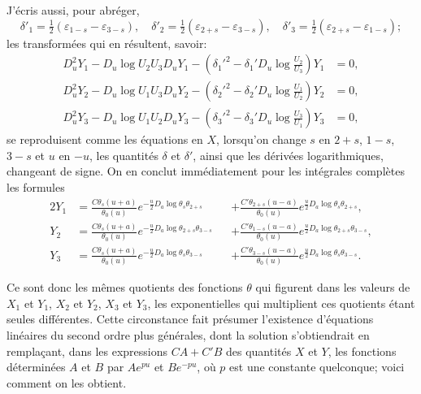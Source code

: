 \documentclass[11pt,leqno,oneside,letterpaper]{book}[2005/09/16]
\begin{document}
J'\'ecris aussi, pour abr\'eger,
\[
\delta'_1 = \tfrac{1}{2}( \varepsilon_{1-s} - \varepsilon_{3-s}), \quad
\delta'_2 = \tfrac{1}{2}( \varepsilon_{2+s} - \varepsilon_{3-s}), \quad
\delta'_3  = \tfrac{1}{2}( \varepsilon_{2+s} - \varepsilon_{1-s});
\]
les transform\'ees qui en r\'esultent, savoir:
\begin{align*}
D_u^2 Y_1 - D_u \log U_2 U_3 D_u Y_1 - \left( \delta_1'^2 - \delta_1' D_u \log \frac{U_2}{U_3} \right) Y_1 &= 0, \\
D_u^2 Y_2 - D_u \log U_1 U_3 D_u Y_2 - \left( \delta_2'^2 - \delta_2' D_u \log \frac{U_1}{U_2} \right) Y_2 &= 0, \\
D_u^2 Y_3 - D_u \log U_1 U_2 D_u Y_3 - \left( \delta_3'^2 - \delta_3' D_u \log \frac{U_3}{U_1} \right) Y_3 &= 0,
\end{align*}
se reproduisent comme les \'equations en $X$, lorsqu'on change $s$ en $2+s$,
$1-s$, $3-s$ et $u$ en $-u$, les quantit\'es $\delta$ et $\delta'$, ainsi que les d\'eriv\'ees logarithmiques,
changeant de signe. On en conclut imm\'ediatement pour les int\'egrales
compl\`etes les formules
\begin{alignat*}{2}
Y_1 &= \frac{ C  \theta_s     (u + a) }{ \theta_0(u) } e^{-\frac{u}{2} D_a \log \theta_s     \theta_{2+s}}
     &&+ \frac{ C' \theta_{2+s} (u - a) }{ \theta_0(u) } e^{ \frac{u}{2} D_a \log \theta_s     \theta_{2+s}} , \\
Y_2 &= \frac{ C  \theta_s     (u + a) }{ \theta_0(u) } e^{-\frac{u}{2} D_a \log \theta_{2+s} \theta_{3-s}}
     &&+ \frac{ C' \theta_{1-s} (u - a) }{ \theta_0(u) } e^{ \frac{u}{2} D_a \log \theta_{2+s} \theta_{3-s}} , \\
Y_3 &= \frac{ C  \theta_s     (u + a) }{ \theta_0(u) } e^{-\frac{u}{2} D_a \log \theta_s     \theta_{3-s}}
     &&+ \frac{ C' \theta_{3-s} (u - a) }{ \theta_0(u) } e^{ \frac{u}{2} D_a \log \theta_s     \theta_{3-s}} .
\end{alignat*}

Ce sont donc les m\^emes quotients des fonctions $\theta$ qui figurent dans
les valeurs de $X_1$ et $Y_1$, $X_2$ et $Y_2$, $X_3$ et $Y_3$, les exponentielles qui multiplient
ces quotients \'etant seules diff\'erentes. Cette circonstance fait pr\'esumer
l'existence d'\'equations lin\'eaires du second ordre plus g\'en\'erales, dont la
solution s'obtiendrait en rempla\c{c}ant, dans les expressions $CA + C'B$ des
quantit\'es $X$ et $Y$, les fonctions d\'etermin\'ees $A$ et $B$ par $A e^{pu}$ et $B e^{-pu}$, o\`u $p$
est une constante quelconque; voici comment on les obtient.
\end{document}
